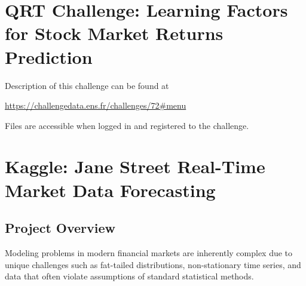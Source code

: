 \documentclass[11pt]{article}
\begin{document}
\begin{enumerate}
%
%
%

\end{enumerate}

\newpage

\section{QRT Challenge: Learning Factors for Stock Market Returns Prediction}

Description of this challenge can be found at

\url{https://challengedata.ens.fr/challenges/72#menu} 

\noindent Files are accessible when logged in and registered to the challenge.

\section{Kaggle: Jane Street Real-Time Market Data Forecasting}

\subsection{Project Overview}
Modeling problems in modern financial markets are inherently complex due to unique challenges such as fat-tailed distributions, non-stationary time series, and data that often violate assumptions of standard statistical methods. 
\end{document}
